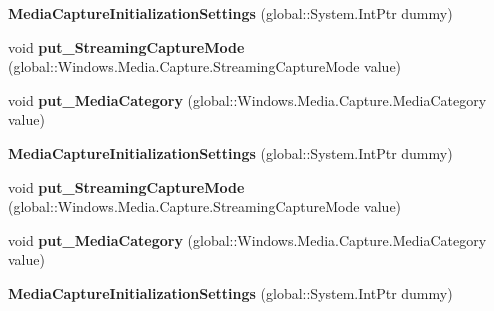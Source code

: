 \begin{DoxyCompactItemize}
{\bfseries Media\+Capture\+Initialization\+Settings} (global\+::\+System.\+Int\+Ptr dummy)
\item 
\mbox{\label{class_windows_1_1_media_1_1_capture_1_1_media_capture_initialization_settings_a1fe5c8f5b538af9f1d18229efda3e968}} 
void {\bfseries put\+\_\+\+Streaming\+Capture\+Mode} (global\+::\+Windows.\+Media.\+Capture.\+Streaming\+Capture\+Mode value)
\item 
\mbox{\label{class_windows_1_1_media_1_1_capture_1_1_media_capture_initialization_settings_a9ec43e909f9030339cf2eb4f47c0e14f}} 
void {\bfseries put\+\_\+\+Media\+Category} (global\+::\+Windows.\+Media.\+Capture.\+Media\+Category value)
\item 
\mbox{\label{class_windows_1_1_media_1_1_capture_1_1_media_capture_initialization_settings_ac7187e1a40d8f32e90a7585f37dec31c}} 
{\bfseries Media\+Capture\+Initialization\+Settings} (global\+::\+System.\+Int\+Ptr dummy)
\item 
\mbox{\label{class_windows_1_1_media_1_1_capture_1_1_media_capture_initialization_settings_a1fe5c8f5b538af9f1d18229efda3e968}} 
void {\bfseries put\+\_\+\+Streaming\+Capture\+Mode} (global\+::\+Windows.\+Media.\+Capture.\+Streaming\+Capture\+Mode value)
\item 
\mbox{\label{class_windows_1_1_media_1_1_capture_1_1_media_capture_initialization_settings_a9ec43e909f9030339cf2eb4f47c0e14f}} 
void {\bfseries put\+\_\+\+Media\+Category} (global\+::\+Windows.\+Media.\+Capture.\+Media\+Category value)
\item 
\mbox{\label{class_windows_1_1_media_1_1_capture_1_1_media_capture_initialization_settings_ac7187e1a40d8f32e90a7585f37dec31c}} 
{\bfseries Media\+Capture\+Initialization\+Settings} (global\+::\+System.\+Int\+Ptr dummy)
\item 
\mbox{\label{class_windows_1_1_media_1_1_capture_1_1_media_capture_initialization_settings_a1fe5c8f5b538af9f1d18229efda3e968}} 

\end{DoxyCompactItemize}
